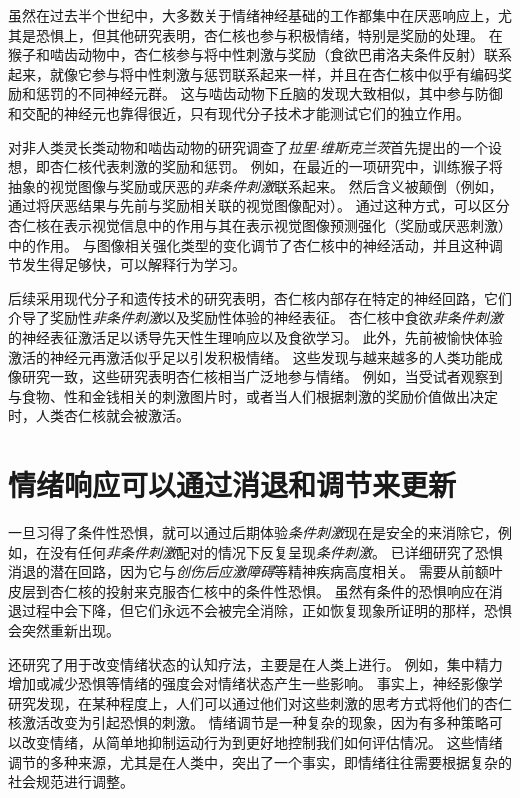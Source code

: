 虽然在过去半个世纪中，大多数关于情绪神经基础的工作都集中在厌恶响应上，尤其是恐惧上，但其他研究表明，杏仁核也参与积极情绪，特别是奖励的处理。
在猴子和啮齿动物中，杏仁核参与将中性刺激与奖励（食欲巴甫洛夫条件反射）联系起来，就像它参与将中性刺激与惩罚联系起来一样，并且在杏仁核中似乎有编码奖励和惩罚的不同神经元群。
这与啮齿动物下丘脑的发现大致相似，其中参与防御和交配的神经元也靠得很近，只有现代分子技术才能测试它们的独立作用。


对非人类灵长类动物和啮齿动物的研究调查了\textit{拉里$\cdot$维斯克兰茨}首先提出的一个设想，即杏仁核代表刺激的奖励和惩罚。
例如，在最近的一项研究中，训练猴子将抽象的视觉图像与奖励或厌恶的\textit{非条件刺激}联系起来。
然后含义被颠倒（例如，通过将厌恶结果与先前与奖励相关联的视觉图像配对）。
通过这种方式，可以区分杏仁核在表示视觉信息中的作用与其在表示视觉图像预测强化（奖励或厌恶刺激）中的作用。
与图像相关强化类型的变化调节了杏仁核中的神经活动，并且这种调节发生得足够快，可以解释行为学习。


后续采用现代分子和遗传技术的研究表明，杏仁核内部存在特定的神经回路，它们介导了奖励性\textit{非条件刺激}以及奖励性体验的神经表征。
杏仁核中食欲\textit{非条件刺激}的神经表征激活足以诱导先天性生理响应以及食欲学习。
此外，先前被愉快体验激活的神经元再激活似乎足以引发积极情绪。
这些发现与越来越多的人类功能成像研究一致，这些研究表明杏仁核相当广泛地参与情绪。
例如，当受试者观察到与食物、性和金钱相关的刺激图片时，或者当人们根据刺激的奖励价值做出决定时，人类杏仁核就会被激活。



\section{情绪响应可以通过消退和调节来更新}

一旦习得了条件性恐惧，就可以通过后期体验\textit{条件刺激}现在是安全的来消除它，例如，在没有任何\textit{非条件刺激}配对的情况下反复呈现\textit{条件刺激}。
已详细研究了恐惧消退的潜在回路，因为它与\textit{创伤后应激障碍}等精神疾病高度相关。
需要从前额叶皮层到杏仁核的投射来克服杏仁核中的条件性恐惧。
虽然有条件的恐惧响应在消退过程中会下降，但它们永远不会被完全消除，正如恢复现象所证明的那样，恐惧会突然重新出现。


还研究了用于改变情绪状态的认知疗法，主要是在人类上进行。
例如，集中精力增加或减少恐惧等情绪的强度会对情绪状态产生一些影响。
事实上，神经影像学研究发现，在某种程度上，人们可以通过他们对这些刺激的思考方式将他们的杏仁核激活改变为引起恐惧的刺激。
情绪调节是一种复杂的现象，因为有多种策略可以改变情绪，从简单地抑制运动行为到更好地控制我们如何评估情况。
这些情绪调节的多种来源，尤其是在人类中，突出了一个事实，即情绪往往需要根据复杂的社会规范进行调整。



